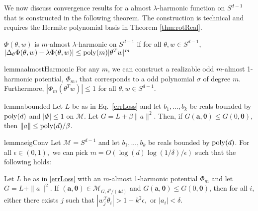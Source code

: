 We now discuss convergence results for a almost $\lambda$-harmonic function on $S^{d-1}$ that is constructed in the following theorem. The construction is technical and requires the Hermite polynomial basis in Theorem \ref{thm:rotReal}.
%
\begin{definition}
$\Phi(\theta, w)$ is $m$-almost $\lambda$-harmonic on $S^{d-1}$ if for
all $\theta, w\in S^{d-1}$, $|\Delta_{\theta}\Phi(\theta, w) - \lambda \Phi (\theta,w)| \leq \mathrm{poly}(m)|\theta^Tw|^m$ 
\end{definition}


\begin{restatable}{lemma}{almostHarmonic}\label{AlmostHarmonic}
For any $m$, we can construct a realizable odd $m$-almost 1-harmonic potential, $\Phi_m$, that corresponds to a odd polynomial $\sigma$ of degree $m$. Furthermore, $|\Phi_m(\theta^Tw)|\leq 1$ for all $\theta, w \in S^{d-1}$.
\end{restatable}
%
%
\begin{restatable}{lemma}{bounded}
\label{bounded}
  Let $L$ be as in Eq.~\eqref{errLoss} and let $b_1,...,b_k$ be reals
  bounded by $\mathrm{poly}(d)$ and $|\Phi|\leq 1$ on $\mathcal{M}$. Let
  $G = L + \beta\|a\|^2$. Then, if
  $G(\boldsymbol{a,\theta}) \leq G(0,\boldsymbol{\theta})$, then
  $\|a\| \leq \mathrm{poly}(d)/\beta$.
\end{restatable}
%
%
\begin{restatable}{lemma}{eigConv}
\label{eigConv}
Let $\mathcal{M} = S^{d-1}$ and let $b_1,...,b_k$ be reals bounded by
$\mathrm{poly}(d)$. For all $\epsilon \in (0,1),$ we can pick
$m = O(\log(d)\log(1/\delta)/\epsilon)$ such that the following holds:

Let $L$ be as in \eqref{errLoss} with an $m$-almost 1-harmonic
potential $\Phi_m$ and let $G = L + \|a\|^2$.  If
$(\boldsymbol{a,\theta}) \in \mathcal{M}_{G, \delta^2/(4d)}$ and
$G(\boldsymbol{a,\theta}) \leq G(0,\boldsymbol{\theta})$, then for all
$i$, either there exists $j$ such that
$|w_j^T\theta_i| > 1- k^2\epsilon,$ or $|a_i| < \delta$.
\end{restatable}
%
